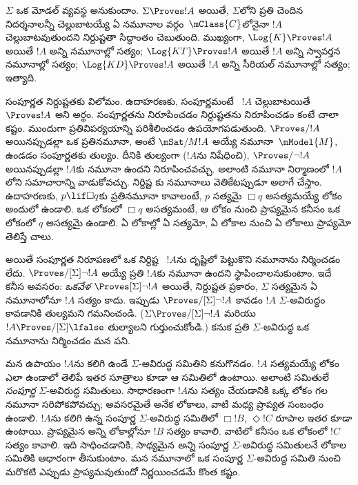 \documentclass[../../../include/open-logic-section]{subfiles}
\begin{document}


$\Sigma$ ఒక మోడల్ వ్యవస్థ అనుకుందాం. $\Sigma \Proves !A$ అయితే,
$\Sigma$లోని ప్రతి  చెందిన నిదర్శనాలన్నీ
చెల్లుబాటయ్యే ఏ నమూనాల వర్గం~$\mClass{C}$లోనైనా $!A$ చెల్లుబాటవుతుందని
నిర్దుష్టతా సిద్ధాంతం చెబుతుంది. ముఖ్యంగా,
$\Log{K} \Proves !A$ అయితే $!A$ అన్ని నమూనాల్లో సత్యం;
$\Log{KT} \Proves !A$ అయితే $!A$ అన్ని స్వావర్తన నమూనాల్లో సత్యం;
$\Log{KD} \Proves !A$ అయితే $!A$ అన్ని సీరియల్ నమూనాల్లో సత్యం;
ఇత్యాది.

సంపూర్ణత నిర్దుష్టతకు విలోమం. ఉదాహరణకు, 
సంపూర్ణమంటే ~$!A$
చెల్లుబాటయితే $\Proves !A$ అని అర్థం. సంపూర్ణతను నిరూపించడం
నిర్దుష్టతను నిరూపించడం కంటే చాలా కష్టం. ముందుగా
ప్రతివిపర్యయాన్ని పరిశీలించడం ఉపయోగపడుతుంది. $\Proves/ !A$ అయినప్పుడల్లా ఒక ప్రతినమూనా,
అంటే $\mSat/{M}{!A}$ అయ్యే నమూనా~$\mModel{M}$,
ఉండడం  సంపూర్ణతకు తుల్యం. దీనికి తుల్యంగా
($!A$ను నిషేధించి), $\Proves/ \lnot !A$ అయినప్పుడల్లా
$!A$కు నమూనా ఉందని నిరూపించవచ్చు. అలాంటి నమూనా నిర్మాణంలో
$!A$లోని సమాచారాన్ని వాడుకోవచ్చు. నిర్దిష్ట
కు నమూనాలు వెతికేటప్పుడూ అలాగే
చేస్తాం. ఉదాహరణకు, $p \lif \Box q$కు ప్రతినమూనా కావాలంటే,
$p$ సత్యమై $\Box q$ అసత్యమయ్యే లోకం అందులో ఉండాలి. ఒక లోకంలో
$\Box q$ అసత్యమంటే, ఆ లోకం నుంచి ప్రాప్యమైన కనీసం ఒక లోకంలో $q$
అసత్యమై ఉండాలి. ఏ లోకాల్లో ఏ
సత్యమో, ఏ లోకాల నుంచి ఏ లోకాలు ప్రాప్యమో తెలిస్తే చాలు.

అయితే సంపూర్ణత నిరూపణలో ఒక నిర్దిష్ట
~$!A$ను దృష్టిలో పెట్టుకొని నమూనాను నిర్మించడం లేదు.
$\Proves/[\Sigma] \lnot !A$ అయ్యే ప్రతి $!A$కు నమూనా ఉందని
స్థాపించాలనుకుంటాం. ఇదే కనీస అవసరం: \emph{ఒకవేళ}
$\Proves[\Sigma] \lnot !A$ అయితే, నిర్దుష్టత ప్రకారం,
$\Sigma$ సత్యమైన ఏ నమూనాలోనూ $!A$ సత్యం కాదు.
ఇప్పుడు $\Proves/[\Sigma] \lnot !A$ కావడం
$!A$ $\Sigma$-అవిరుద్ధం కావడానికి తుల్యమని గమనించండి.
($\Sigma \Proves/[\Sigma] \lnot !A$ మరియు $!A \Proves/[\Sigma] \lfalse$
తుల్యాలని గుర్తుంచుకోండి.)
కనుక ప్రతి $\Sigma$-అవిరుద్ధ
 ఒక నమూనాను నిర్మించడం మన పని.

మన ఉపాయం $!A$ను కలిగి ఉండే $\Sigma$-అవిరుద్ధ
 సమితిని కనుగొనడం. $!A$
సత్యమయ్యే లోకం ఎలా ఉండాలో తెలిపే ఇతర సూత్రాలు కూడా
ఆ సమితిలో ఉంటాయి. అలాంటి సమితులే \emph{సంపూర్ణ} $\Sigma$-అవిరుద్ధ
సమితులు. సాధారణంగా $!A$ను సత్యం చేయడానికి ఒక్క లోకం గల నమూనా
సరిపోకపోవచ్చు; అవసరమైతే అనేక లోకాలు, వాటి మధ్య ప్రాప్యత
సంబంధం ఉండాలి. $!A$ను
కలిగి ఉన్న సంపూర్ణ $\Sigma$-అవిరుద్ధ సమితిలో $\Box !B$,
$\Diamond !C$ రూపాల ఇతర  కూడా
ఉంటాయి. ప్రాప్యమైన అన్ని లోకాల్లోనూ $!B$ సత్యం కావాలి.
వాటిలో కనీసం ఒక లోకంలో $!C$ సత్యం కావాలి. ఇది సాధించడానికి,
సాధ్యమైన \emph{అన్ని} సంపూర్ణ $\Sigma$-అవిరుద్ధ సమితులనే
లోకాల సమితికి ఆధారంగా తీసుకుంటాం. మన నమూనాలో ఒక సంపూర్ణ
$\Sigma$-అవిరుద్ధ సమితి నుంచి మరొకటి ఎప్పుడు ప్రాప్యమవుతుందో
నిర్ణయించడమే కొంత కష్టం.
\end{document}

